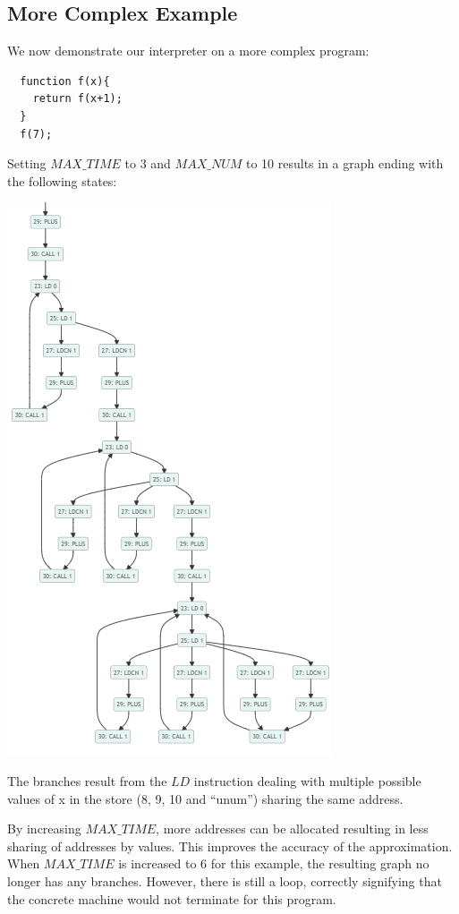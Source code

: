 \documentclass[12pt]{article}
\begin{document}
\subsection{More Complex Example}
We now demonstrate our interpreter on a more complex program:
\begin{verbatim}
  function f(x){
    return f(x+1);
  }
  f(7);
\end{verbatim}
Setting $MAX\_TIME$ to 3 and $MAX\_NUM$ to 10 results in a graph ending with the following states:
\begin{center}
  \includegraphics[scale=0.6]{complex_graph.png}
\end{center}
The branches result from the $LD$ instruction dealing with multiple possible values of x in the store (8, 9, 10 and ``unum'') sharing the same address.

By increasing $MAX\_TIME$, more addresses can be allocated resulting in less sharing of addresses by values. This improves the accuracy of the approximation. When $MAX\_TIME$ is increased to 6 for this example, the resulting graph no longer has any branches. However, there is still a loop, correctly signifying that the concrete machine would not terminate for this program.
\end{document}
